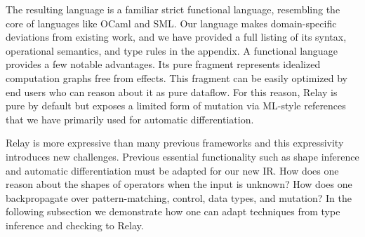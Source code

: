   The resulting language is a familiar strict functional language,
    resembling the core of languages like OCaml and SML.
  Our language makes domain-specific deviations from existing work,
    and we have provided a full listing
    of its syntax, operational semantics, and type rules
    in the appendix.
  A functional language provides a few notable advantages.
  Its pure fragment represents idealized computation graphs free
    from effects. This fragment can be easily optimized by end users who
    can reason about it as pure dataflow.
  For this reason, Relay is pure by default but exposes a limited
    form of mutation via ML-style references that we have
    primarily used for automatic differentiation.

  Relay is more expressive than many previous frameworks and this expressivity introduces new challenges.
    Previous essential functionality such
     as shape inference and automatic differentiation must be adapted for
     our new IR.
  How does one reason about the shapes of operators when the input is unknown?
  How does one backpropagate over pattern-matching, control, data types, and mutation?
  In the following subsection we demonstrate how one can adapt techniques
    from type inference and checking to Relay.




